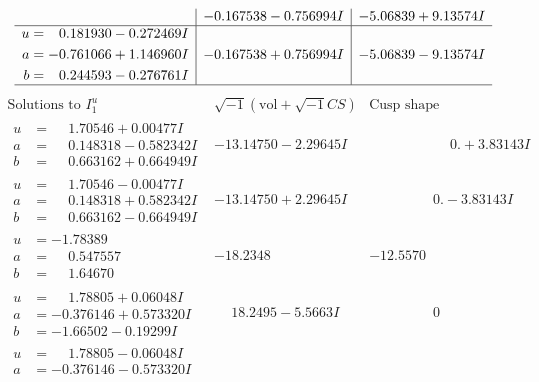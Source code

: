 \documentclass[1p]{elsarticle_modified}
\theoremstyle{definition}
\newcommand{\I}{\sqrt{-1}}
\begin{document}
$$\begin{array}{c|c|c}
 & -0.167538 - 0.756994 I & -5.06839 + 9.13574 I \\ \hline\begin{aligned}
u &= \phantom{-}0.181930 - 0.272469 I \\
a &= -0.761066 + 1.146960 I \\
b &= \phantom{-}0.244593 - 0.276761 I\end{aligned}
 & -0.167538 + 0.756994 I & -5.06839 - 9.13574 I\\
 \hline 
 \end{array}$$\newpage$$\begin{array}{c|c|c}  
\text{Solutions to }I^u_{1}& \I (\text{vol} + \sqrt{-1}CS) & \text{Cusp shape}\\
 \hline 
\begin{aligned}
u &= \phantom{-}1.70546 + 0.00477 I \\
a &= \phantom{-}0.148318 - 0.582342 I \\
b &= \phantom{-}0.663162 + 0.664949 I\end{aligned}
 & -13.14750 - 2.29645 I & \phantom{-0.000000 -}0. + 3.83143 I \\ \hline\begin{aligned}
u &= \phantom{-}1.70546 - 0.00477 I \\
a &= \phantom{-}0.148318 + 0.582342 I \\
b &= \phantom{-}0.663162 - 0.664949 I\end{aligned}
 & -13.14750 + 2.29645 I & \phantom{-0.000000 } 0. - 3.83143 I \\ \hline\begin{aligned}
u &= -1.78389\phantom{ +0.000000I} \\
a &= \phantom{-}0.547557\phantom{ +0.000000I} \\
b &= \phantom{-}1.64670\phantom{ +0.000000I}\end{aligned}
 & -18.2348\phantom{ +0.000000I} & -12.5570\phantom{ +0.000000I} \\ \hline\begin{aligned}
u &= \phantom{-}1.78805 + 0.06048 I \\
a &= -0.376146 + 0.573320 I \\
b &= -1.66502 - 0.19299 I\end{aligned}
 & \phantom{-}18.2495 - 5.5663 I & \phantom{-0.000000 } 0 \\ \hline\begin{aligned}
u &= \phantom{-}1.78805 - 0.06048 I \\
a &= -0.376146 - 0.573320 I \\

\end{aligned}
\end{array}$$
\end{document}
